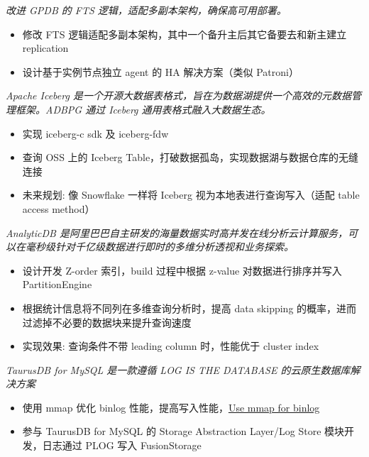 \documentclass{resume}
\begin{document}
\textit{改进 GPDB 的 FTS 逻辑，适配多副本架构，确保高可用部署。}
\begin{onehalfspacing}
\begin{itemize}
  \item 修改 FTS 逻辑适配多副本架构，其中一个备升主后其它备要去和新主建立 replication
  \item 设计基于实例节点独立 agent 的 HA 解决方案（类似 Patroni）
\end{itemize}
\end{onehalfspacing}

\textit{Apache Iceberg 是一个开源大数据表格式，旨在为数据湖提供一个高效的元数据管理框架。ADBPG 通过 Iceberg 通用表格式融入大数据生态。}
\begin{onehalfspacing}
\begin{itemize}
  \item 实现 iceberg-c sdk 及 iceberg-fdw
  \item 查询 OSS 上的 Iceberg Table，打破数据孤岛，实现数据湖与数据仓库的无缝连接
  \item 未来规划: 像 Snowflake 一样将 Iceberg 视为本地表进行查询写入（适配 table access method）
\end{itemize}
\end{onehalfspacing}

\textit{AnalyticDB 是阿里巴巴自主研发的海量数据实时高并发在线分析云计算服务，可以在毫秒级针对千亿级数据进行即时的多维分析透视和业务探索。}
\begin{onehalfspacing}
\begin{itemize}
  \item 设计开发 Z-order 索引，build 过程中根据 z-value 对数据进行排序并写入 PartitionEngine
  \item 根据统计信息将不同列在多维查询分析时，提高 data skipping 的概率，进而过滤掉不必要的数据块来提升查询速度
  \item 实现效果: 查询条件不带 leading column 时，性能优于 cluster index
\end{itemize}
\end{onehalfspacing}

\textit{TaurusDB for MySQL 是一款遵循 LOG IS THE DATABASE 的云原生数据库解决方案}
\begin{onehalfspacing}
\begin{itemize}
  \item 使用 mmap 优化 binlog 性能，提高写入性能，\href{https://github.com/mysql/mysql-server/pull/314}{Use mmap for binlog}
  \item 参与 TaurusDB for MySQL 的 Storage Abstraction Layer/Log Store 模块开发，日志通过 PLOG 写入 FusionStorage
\end{itemize}
\end{onehalfspacing}
\end{document}
